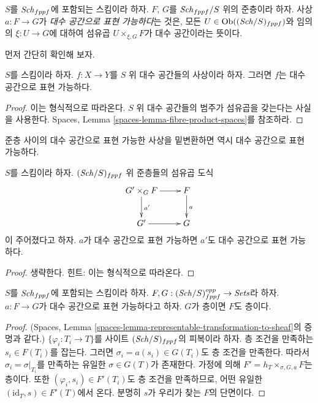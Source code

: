 \begin{definition}
\label{definition-morphism-representable-by-spaces}
$S$를 $\mathit{Sch}_{fppf}$에 포함되는 스킴이라 하자.
$F$, $G$를 $\mathit{Sch}_{fppf}/S$ 위의 준층이라 하자.
사상 $a : F \to G$가 {\it 대수 공간으로 표현 가능하다}는 것은,
모든 $U \in \mathop{\mathrm{Ob}}\nolimits((\mathit{Sch}/S)_{fppf})$와 임의의 $\xi : U \to G$에 대하여
섬유곱 $U \times_{\xi, G} F$가 대수 공간이라는 뜻이다.
\end{definition}

\noindent
먼저 간단히 확인해 보자.

\begin{lemma}
\label{lemma-morphism-spaces-is-representable-by-spaces}
$S$를 스킴이라 하자.
$f : X \to Y$를 $S$ 위 대수 공간들의 사상이라 하자.
그러면 $f$는 대수 공간으로 표현 가능하다.
\end{lemma}

\begin{proof}
이는 형식적으로 따라온다. $S$ 위 대수 공간들의 범주가 섬유곱을
갖는다는 사실을 사용한다. Spaces, Lemma
\ref{spaces-lemma-fibre-product-spaces}를 참조하라.
\end{proof}

\begin{lemma}
\label{lemma-base-change-transformation}
\begin{slogan}
준층 사이의 대수 공간으로 표현 가능한 사상을 밑변환하면 역시
대수 공간으로 표현 가능하다.
\end{slogan}
$S$를 스킴이라 하자. $(\mathit{Sch}/S)_{fppf}$ 위 준층들의 섬유곱 도식
$$
\xymatrix{
G' \times_G F \ar[r] \ar[d]^{a'} & F \ar[d]^a \\
G' \ar[r] & G
}
$$
이 주어졌다고 하자. $a$가 대수 공간으로 표현 가능하면 $a'$도
대수 공간으로 표현 가능하다.
\end{lemma}

\begin{proof}
생략한다. 힌트: 이는 형식적으로 따라온다.
\end{proof}

\begin{lemma}
\label{lemma-representable-by-spaces-transformation-to-sheaf}
$S$를 $\mathit{Sch}_{fppf}$에 포함되는 스킴이라 하자.
$F, G : (\mathit{Sch}/S)_{fppf}^{opp} \to \textit{Sets}$라 하자.
$a : F \to G$가 대수 공간으로 표현 가능하다고 하자.
$G$가 층이면 $F$도 층이다.
\end{lemma}

\begin{proof}
(Spaces, Lemma
\ref{spaces-lemma-representable-transformation-to-sheaf}의 증명과 같다.)
$\{\varphi_i : T_i \to T\}$를 사이트 $(\mathit{Sch}/S)_{fppf}$의 피복이라 하자.
층 조건을 만족하는 $s_i \in F(T_i)$를 잡는다.
그러면 $\sigma_i = a(s_i) \in G(T_i)$도 층 조건을 만족한다.
따라서 $\sigma_i = \sigma|_{T_i}$를 만족하는 유일한
$\sigma \in G(T)$가 존재한다. 가정에 의해
$F' = h_T \times_{\sigma, G, a} F$는 층이다.
또한 $(\varphi_i, s_i) \in F'(T_i)$도 층 조건을 만족하므로, 어떤 유일한
$(\text{id}_T, s) \in F'(T)$에서 온다. 분명히 $s$가 우리가 찾는
$F$의 단면이다.
\end{proof}

